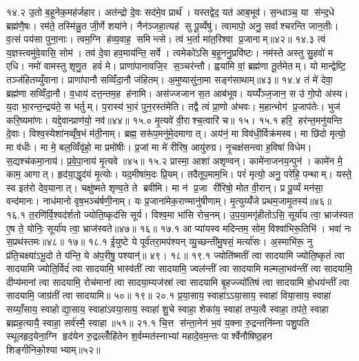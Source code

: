१४.२
उ॒तो ब॒हूनेक॒मह॑र्जहार। अत॑न्द्रो दे॒वः सद॑मे॒व प्रार्थ॑। यस्तद्वेद॒ यत॑ आब॒भूव॑। स॒न्धाञ्च॒ या स॑न्द॒धे ब्रह्म॑णै॒षः। रम॑ते॒ तस्मि॑न्नु॒त जी॒र्णे शया॑ने। नैन॑ञ्जहा॒त्यह॑ सु पू॒र्व्येषु॑। त्वामापो॒ अनु॒ सर्वाश्चरन्ति जान॒तीः। व॒त्सं पय॑सा पुना॒नाः। त्वम॒ग्नि ह॑व्य॒वाह॒ समिन्त्से। त्वं भ॒र्ता मा॑त॒रिश्वा प्र॒जानाम्॥४२॥
१४.३
त्वं य॒ज्ञस्त्वमु॑वे॒वासि॒ सोम॑। तव॑ दे॒वा हव॒माय॑न्ति॒ सर्वे। त्वमेको॑ऽसि ब॒हूननु॒प्रवि॑ष्टः। नम॑स्ते अस्तु सु॒हवो॑ म एधि। नमो॑ वामस्तु शृणु॒त हवं॑ मे। प्राणा॑पानावजि॒र स॒ञ्चर॑न्तौ। ह्वया॑मि वां॒ ब्रह्म॑णा तू॒र्तमेतम्। यो मान्द्वेष्टि॒ तञ्ज॑हितय्युँवाना। प्राणा॑पानौ सव्विँदा॒नौ ज॑हितम्। अ॒मुष्यासु॑ना॒मा सङ्ग॑साथाम्॥४३॥
१४.४
तं मे॑ देवा॒ ब्रह्म॑णा सव्विँदा॒नौ। व॒धाय॑ दत्त॒न्तम॒ह ह॑नामि। अस॑ज्जजान स॒त आब॑भूव। यय्यँ॑ञ्ज॒जान॒ स उ॑ गो॒पो अ॑स्य। य॒दा भा॒रन्त॒न्द्रय॑ते॒ स भर्तुम्। प॒रास्य॑ भा॒रं पुन॒रस्त॑मेति। तद्वै त्वं प्रा॒णो अ॑भवः। म॒हान्भोग॑ प्र॒जाप॑तेः। भुज॑ करि॒ष्यमा॑णः। यद्दे॒वान्प्राण॑यो॒ नव॑॥४४॥
१५.०
मृ॒त्यवे॑ वी॒राश्च॒त्वारि॑ च॥ १५।
\anuvakamend
१५.१
हरि॒ हर॑न्त॒मनु॑यन्ति दे॒वाः। विश्व॒स्येशा॑नव्वृँष॒भं म॑ती॒नाम्। ब्रह्म॒ सरू॑प॒मनु॑मे॒दमागात्। अय॑नं॒ मा विव॑धी॒र्विक्र॑मस्व। मा छि॑दो मृत्यो॒ मा व॑धीः। मा मे॒ बल॒व्विँवृ॑हो॒ मा प्रमो॑षीः। प्र॒जां मा मे॑ रीरिष॒ आयु॑रुग्र। नृ॒चक्ष॑सन्त्वा ह॒विषा॑ विधेम। स॒द्यश्च॑कमा॒नाय॑। प्र॒वे॒पा॒नाय॑ मृ॒त्यवे॥४५॥
१५.२
प्रास्मा॒ आशा॑ अशृण्वन्। कामे॑नाजनय॒न्पुन॑। कामे॑न मे॒ काम॒ आगात्। हृद॑या॒द्धृद॑यं मृ॒त्योः। यद॒मीषा॑म॒दः प्रि॒यम्। तदैतूप॒माम॒भि। परं॑ मृत्यो॒ अनु॒ परे॑हि॒ पन्थाम्। यस्ते॒ स्व इत॑रो देव॒यानात्। चक्षु॑ष्मते शृण्व॒ते ते ब्रवीमि। मा न॑ प्र॒जा री॑रिषो॒ मोत वी॒रान्। प्र पू॒र्व्यं मन॑सा॒ वन्द॑मानः। नाध॑मानो वृष॒भञ्च॑र्\mbox{}षणी॒नाम्। यः प्र॒जाना॑मेक॒राण्मानु॑षीणाम्। मृ॒त्युय्यँ॑जे प्रथम॒जामृ॒तस्य॑॥४६॥
\anuvakamend
१६.१
त॒रणि॑र्वि॒श्वद॑र्\mbox{}शतो ज्योति॒ष्कृद॑सि सूर्य। विश्व॒मा भा॑सि रोच॒नम्। उ॒प॒या॒मगृ॑हीतोऽसि॒ सूर्या॑य त्वा॒ भ्राज॑स्वत ए॒ष ते॒ योनिः॒ सूर्या॑य त्वा॒ भ्राज॑स्वते॥४७॥ १६॥
\anuvakamend
१७.१
आ प्या॑यस्व मदिन्तम॒ सोम॒ विश्वा॑भिरू॒तिभि॑। भवा॑ नः स॒प्रथ॑स्तमः॥४८॥ १७॥
\anuvakamend
१८.१
ई॒युष्टे ये पूर्व॑तरा॒मप॑श्यन् व्यु॒च्छन्ती॑मु॒षसं॒ मर्त्या॑सः। अ॒स्माभि॑रू॒ नु प्र॑ति॒चक्ष्या॑ऽभू॒दो ते य॑न्ति॒ ये अ॑प॒रीषु॒ पश्यान्॑॥ ४९। १८॥
\anuvakamend
१९.१
ज्योति॑ष्मतीं त्वा सादयामि ज्योति॒ष्कृतं॑ त्वा सादयामि ज्योति॒र्विदं॑ त्वा सादयामि॒ भास्व॑तीं त्वा सादयामि॒ ज्वल॑न्तीं त्वा सादयामि मल्मला॒भव॑न्तीं त्वा सादयामि॒ दीप्य॑मानां त्वा सादयामि॒ रोच॑मानां त्वा सादया॒म्यज॑स्रां त्वा सादयामि बृ॒हज्ज्यो॑तिषं त्वा सादयामि बो॒धय॑न्तीं त्वा सादयामि॒ जाग्र॑तीं त्वा सादयामि॥ ५०॥ १९॥
\anuvakamend
२०.१
प्र॒या॒साय॒ स्वाहा॑ऽऽया॒साय॒ स्वाहा॑ विया॒साय॒ स्वाहा॑ सय्याँ॒साय॒ स्वाहोद्या॒साय॒ स्वाहा॑ऽवया॒साय॒ स्वाहा॑ शु॒चे स्वाहा॒ शेका॑य॒ स्वाहा॑ तप्य॒त्वै स्वाहा॒ तप॑ते॒ स्वाहा ब्रह्मह॒त्यायै॒ स्वाहा॒ सर्व॑स्मै॒ स्वाहा॥५१॥%
\anuvakamend
२१.१
चि॒त्त स॑न्ता॒नेन॑ भ॒वं य॒क्ना रु॒द्रन्तनि॑म्ना पशु॒पति स्थूलहृद॒येना॒ग्नि हृद॑येन रु॒द्रल्लोँहि॑तेन श॒र्वम्मत॑स्नाभ्यां महादे॒वम॒न्तः पार्श्वेनौषिष्ठ॒हन शिङ्गीनिको॒श्याभ्याम्॥५२॥%
\anuvakamend

